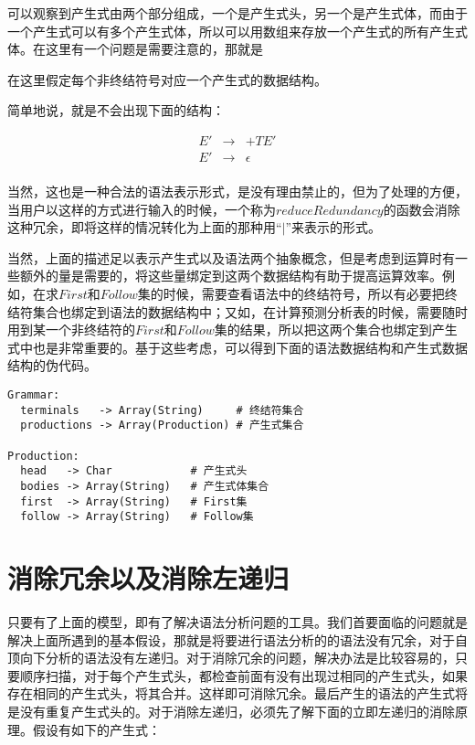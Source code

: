 可以观察到产生式由两个部分组成，一个是产生式头，另一个是产生式体，而由于一个产生式可以有多个产生式体，所以可以用数组来存放一个产生式的所有产生式体。在这里有一个问题是需要注意的，那就是\begin{bfseries}在这里假定每个非终结符号对应一个产生式的数据结构。\end{bfseries}简单地说，就是不会出现下面的结构：

\begin{eqnarray*}
    E' & \rightarrow & +TE' \\
    E' & \rightarrow & \epsilon \\
\end{eqnarray*}

当然，这也是一种合法的语法表示形式，是没有理由禁止的，但为了处理的方便，当用户以这样的方式进行输入的时候，一个称为$reduceRedundancy$的函数会消除这种冗余，即将这样的情况转化为上面的那种用``$|$''来表示的形式。

当然，上面的描述足以表示产生式以及语法两个抽象概念，但是考虑到运算时有一些额外的量是需要的，将这些量绑定到这两个数据结构有助于提高运算效率。例如，在求$First$和$Follow$集的时候，需要查看语法中的终结符号，所以有必要把终结符集合也绑定到语法的数据结构中；又如，在计算预测分析表的时候，需要随时用到某一个非终结符的$First$和$Follow$集的结果，所以把这两个集合也绑定到产生式中也是非常重要的。基于这些考虑，可以得到下面的语法数据结构和产生式数据结构的伪代码。

\begin{verbatim}
Grammar:
  terminals   -> Array(String)     # 终结符集合
  productions -> Array(Production) # 产生式集合

Production:
  head   -> Char            # 产生式头
  bodies -> Array(String)   # 产生式体集合
  first  -> Array(String)   # First集
  follow -> Array(String)   # Follow集
\end{verbatim}

\section{消除冗余以及消除左递归}

只要有了上面的模型，即有了解决语法分析问题的工具。我们首要面临的问题就是解决上面所遇到的基本假设，那就是将要进行语法分析的的语法没有冗余，对于自顶向下分析的语法没有左递归。对于消除冗余的问题，解决办法是比较容易的，只要顺序扫描，对于每个产生式头，都检查前面有没有出现过相同的产生式头，如果存在相同的产生式头，将其合并。这样即可消除冗余。最后产生的语法的产生式将是没有重复产生式头的。对于消除左递归，必须先了解下面的立即左递归的消除原理。假设有如下的产生式：


